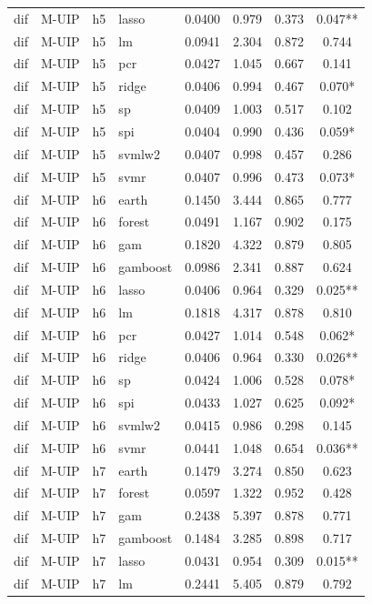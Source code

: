 \begin{ThreePartTable}
\begin{longtable}[t]{llclcccc}
dif & M-UIP & h5 & lasso & 0.0400 & 0.979 & 0.373 & 0.047**\\
dif & M-UIP & h5 & lm & 0.0941 & 2.304 & 0.872 & 0.744\\
dif & M-UIP & h5 & pcr & 0.0427 & 1.045 & 0.667 & 0.141\\
dif & M-UIP & h5 & ridge & 0.0406 & 0.994 & 0.467 & 0.070*\\
dif & M-UIP & h5 & sp & 0.0409 & 1.003 & 0.517 & 0.102\\
dif & M-UIP & h5 & spi & 0.0404 & 0.990 & 0.436 & 0.059*\\
dif & M-UIP & h5 & svmlw2 & 0.0407 & 0.998 & 0.457 & 0.286\\
dif & M-UIP & h5 & svmr & 0.0407 & 0.996 & 0.473 & 0.073*\\
\addlinespace
dif & M-UIP & h6 & earth & 0.1450 & 3.444 & 0.865 & 0.777\\
dif & M-UIP & h6 & forest & 0.0491 & 1.167 & 0.902 & 0.175\\
dif & M-UIP & h6 & gam & 0.1820 & 4.322 & 0.879 & 0.805\\
dif & M-UIP & h6 & gamboost & 0.0986 & 2.341 & 0.887 & 0.624\\
dif & M-UIP & h6 & lasso & 0.0406 & 0.964 & 0.329 & 0.025**\\
dif & M-UIP & h6 & lm & 0.1818 & 4.317 & 0.878 & 0.810\\
dif & M-UIP & h6 & pcr & 0.0427 & 1.014 & 0.548 & 0.062*\\
dif & M-UIP & h6 & ridge & 0.0406 & 0.964 & 0.330 & 0.026**\\
dif & M-UIP & h6 & sp & 0.0424 & 1.006 & 0.528 & 0.078*\\
dif & M-UIP & h6 & spi & 0.0433 & 1.027 & 0.625 & 0.092*\\
dif & M-UIP & h6 & svmlw2 & 0.0415 & 0.986 & 0.298 & 0.145\\
dif & M-UIP & h6 & svmr & 0.0441 & 1.048 & 0.654 & 0.036**\\
\addlinespace
dif & M-UIP & h7 & earth & 0.1479 & 3.274 & 0.850 & 0.623\\
dif & M-UIP & h7 & forest & 0.0597 & 1.322 & 0.952 & 0.428\\
dif & M-UIP & h7 & gam & 0.2438 & 5.397 & 0.878 & 0.771\\
dif & M-UIP & h7 & gamboost & 0.1484 & 3.285 & 0.898 & 0.717\\
dif & M-UIP & h7 & lasso & 0.0431 & 0.954 & 0.309 & 0.015**\\
dif & M-UIP & h7 & lm & 0.2441 & 5.405 & 0.879 & 0.792\\

\end{longtable}
\end{ThreePartTable}
